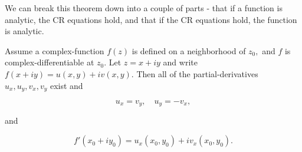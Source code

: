 \documentclass{article}
\begin{document}
We can break this theorem down into a couple of parts - that if a function is \@{analytic}, the CR equations hold, and that if the CR equations hold, the function is analytic.

\begin{theorem}\label{analytic-implies-cr-equations}
Assume a \@{complex-function} $f(z)$ is defined on a \@{neighborhood} of $z_0,$ and $f$ is \@{complex-differentiable} at $z_0.$ Let $z = x+iy$ and write $f(x +iy) = u(x,y) + iv(x,y).$ Then all of the \@{partial-derivatives} $u_x, u_y, v_x, v_y$ exist and

\[ u_x = v_y, \quad u_y = - v_x, \]

and

\[ f'(x_0 + i y_0) = u_x{(x_0, y_0)} + i v_x{(x_0, y_0)}. \]
\end{theorem}
\end{document}
